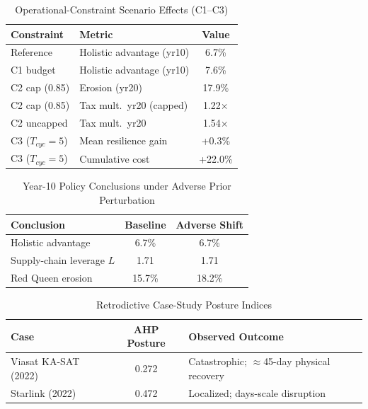 \begin{table}[!t]
\centering
\caption{Operational-Constraint Scenario Effects (C1--C3)}
\label{tab:constraints_live}
\scriptsize
\renewcommand{\arraystretch}{1.15}
\begin{tabular}{llc}
\toprule
\textbf{Constraint} & \textbf{Metric} & \textbf{Value} \\
\midrule
Reference & Holistic advantage (yr10) & 6.7\% \\
C1 budget & Holistic advantage (yr10) & 7.6\% \\
C2 cap (0.85) & Erosion (yr20) & 17.9\% \\
C2 cap (0.85) & Tax mult.\ yr20 (capped) & 1.22$\times$ \\
C2 uncapped & Tax mult.\ yr20 & 1.54$\times$ \\
C3 ($T_{cyc}{=}5$) & Mean resilience gain & +0.3\% \\
C3 ($T_{cyc}{=}5$) & Cumulative cost & +22.0\% \\
\bottomrule
\end{tabular}
\end{table}

\begin{table}[!t]
\centering
\caption{Year-10 Policy Conclusions under Adverse Prior Perturbation}
\label{tab:perturbation_live}
\scriptsize
\renewcommand{\arraystretch}{1.15}
\begin{tabular}{lcc}
\toprule
\textbf{Conclusion} & \textbf{Baseline} & \textbf{Adverse Shift} \\
\midrule
Holistic advantage & 6.7\% & 6.7\% \\
Supply-chain leverage $L$ & 1.71 & 1.71 \\
Red Queen erosion & 15.7\% & 18.2\% \\
\bottomrule
\end{tabular}
\end{table}

\begin{table}[!t]
\centering
\caption{Retrodictive Case-Study Posture Indices}
\label{tab:cases_live}
\scriptsize
\renewcommand{\arraystretch}{1.15}
\begin{tabular}{lcp{3.4cm}}
\toprule
\textbf{Case} & \textbf{AHP Posture} & \textbf{Observed Outcome} \\
\midrule
Viasat KA-SAT (2022) & 0.272 & Catastrophic; $\approx$45-day physical recovery \\
Starlink (2022) & 0.472 & Localized; days-scale disruption \\
\bottomrule
\end{tabular}
\end{table}

